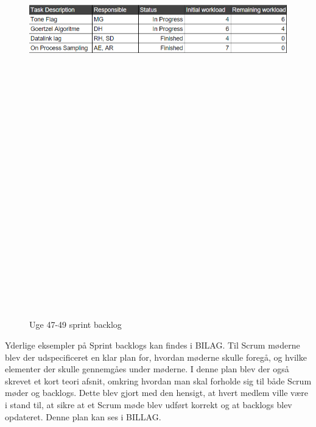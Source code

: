 \begin{figure}[ht]
	\centering
	\includegraphics[width=15cm,height=25cm,keepaspectratio]{pictures/SprintBack47_49.png}
	\caption{Uge 47-49 sprint backlog}
	\label{fig:4749}
\end{figure}
\hfill \break

Yderlige eksempler på Sprint backlogs kan findes i BILAG.
\newline
Til Scrum møderne blev der udspecificeret en klar plan for, hvordan møderne skulle foregå, og hvilke elementer der skulle gennemgåes under møderne. I denne plan blev der også skrevet et kort teori afsnit, omkring hvordan man skal forholde sig til både Scrum møder og backlogs. Dette blev gjort med den hensigt, at hvert medlem ville være i stand til, at sikre at et Scrum møde blev udført korrekt og at backlogs blev opdateret.
\newline
Denne plan kan ses i BILLAG.

